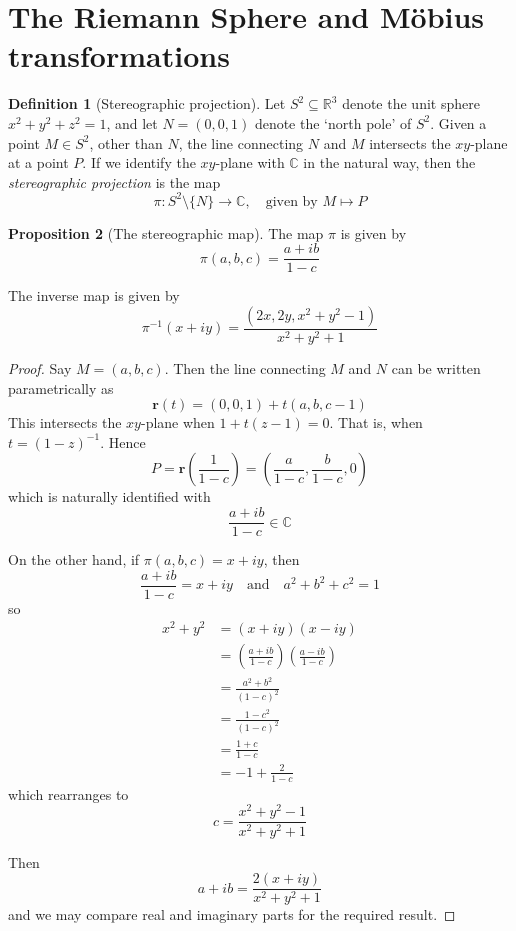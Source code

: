 \documentclass[10pt,fleqn]{article}
\newcommand{\comps}{\mathbb{C}}
\newcommand{\reals}{\mathbb{R}}
\newcommand{\vc}[1]{\boldsymbol{#1}}
\theoremstyle{definition} \newtheorem{defn}{Definition}[section]
\theoremstyle{plain}      \newtheorem{thm}[defn]{Theorem}
\theoremstyle{definition} \newtheorem{prop}[defn]{Proposition}
\theoremstyle{plain}      \newtheorem{lem}[defn]{Lemma}
\theoremstyle{definition} \newtheorem{cor}[defn]{Corollary}
\theoremstyle{definition} \newtheorem{ex}[defn]{Example}
\theoremstyle{definition} \newtheorem{rem}[defn]{Remark}
\begin{document}
\section{The Riemann Sphere and M\"obius transformations}

\begin{defn}[Stereographic projection]
    Let $S^2\subseteq\reals^3$ denote the unit sphere $x^2+y^2+z^2=1$, and let $N=(0,0,1)$ denote the `north pole' of $S^2$.
    Given a point $M\in S^2$, other than $N$, the line connecting $N$ and $M$ intersects the $xy$-plane at a point $P$.
    If we identify the $xy$-plane with $\comps$ in the natural way, then the \emph{stereographic projection} is the map
    \begin{equation}
        \pi:S^2\setminus\{N\}\to\comps,\quad
        \text{given by }M\mapsto P
    \end{equation}
\end{defn}

\begin{prop}[The stereographic map]
    The map $\pi$ is given by
    \begin{equation}
        \pi(a,b,c)=
        \frac{a+ib}{1-c}
    \end{equation}

    The inverse map is given by
    \begin{equation}
        \pi^{-1}(x+iy)=
        \frac{(2x,2y,x^2+y^2-1)}{x^2+y^2+1}
    \end{equation}
\end{prop}

\begin{proof}
    Say $M=(a,b,c)$.
    Then the line connecting $M$ and $N$ can be written parametrically as
    \[
        \vc{r}(t)=
        (0,0,1)+t(a,b,c-1)
    \]
    This intersects the $xy$-plane when $1+t(z-1)=0$.
    That is, when $t=(1-z)^{-1}$.
    Hence
    \[
        P=
        \vc{r}\left(\frac{1}{1-c}\right)=
        \left(\frac{a}{1-c},\frac{b}{1-c},0\right)
    \]
    which is naturally identified with
    \[
        \frac{a+ib}{1-c}\in\comps
    \]

    On the other hand, if $\pi(a,b,c)=x+iy$, then
    \[
        \frac{a+ib}{1-c}=x+iy
        \quad\text{and}\quad
        a^2+b^2+c^2=1
    \]
    so
    \begin{align*}
        x^2+y^2
        &=
        (x+iy)(x-iy)\\
        &=
        \left(\frac{a+ib}{1-c}\right)\left(\frac{a-ib}{1-c}\right)\\
        &=
        \frac{a^2+b^2}{(1-c)^2}\\
        &=
        \frac{1-c^2}{(1-c)^2}\\
        &=
        \frac{1+c}{1-c}\\
        &=
        -1+\frac{2}{1-c}
    \end{align*}
    which rearranges to
    \[
        c=
        \frac{x^2+y^2-1}{x^2+y^2+1}
    \]

    Then
    \[
        a+ib=
        \frac{2(x+iy)}{x^2+y^2+1}
    \]
    and we may compare real and imaginary parts for the required result.
\end{proof}
\end{document}
